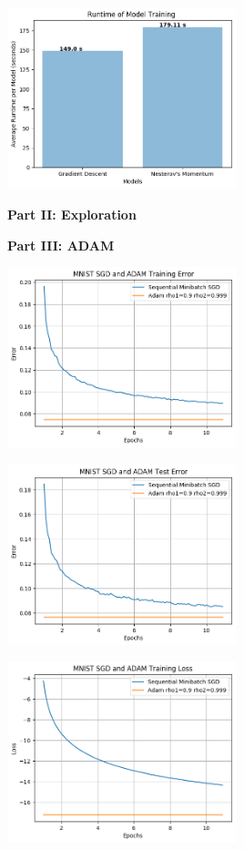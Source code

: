 \documentclass[10pt]{article}
\begin{document}
\begin{center}
    \includegraphics[width=0.5\textwidth]{train_time_part1.png}
\end{center}


\textbf{Part II: Exploration}

\textbf{Part III: ADAM}

\begin{center}
    \includegraphics[width=0.5\textwidth]{SGDandADAMTrainingError.png}
\end{center}
\begin{center}
    \includegraphics[width=0.5\textwidth]{SGDandADAMTestError.png}
\end{center}
\begin{center}
    \includegraphics[width=0.5\textwidth]{SGDandADAMTrainingLoss.png}
\end{center}
\end{document}
